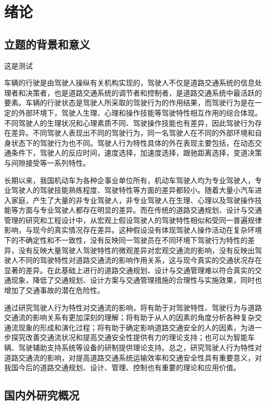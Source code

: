 \chapter{绪论}
\section{立题的背景和意义}
这是测试\cite{seugs:standard}

车辆的行驶是由驾驶人操纵有关机构实现的，驾驶人不仅是道路交通系统的信息处理者和决策者，也是道路交通系统的调节者和控制者，是道路交通系统中最活跃的要素。车辆的行驶状态是驾驶人所采取的驾驶行为的作用结果，而驾驶行为是在一定的外部环境下，驾驶人生理、心理和操作技能等驾驶特性相互作用的综合体现。不同驾驶人的生理状况和心理素质不同、驾驶操作技能也有差异，因此驾驶行为存在差异。不同驾驶人表现出不同的驾驶行为，同一名驾驶人在不同的外部环境和自身状态下的驾驶行为也不同。驾驶人行为特性具体的外在表现主要包括，在动态交通条件下，驾驶人的反应时间，速度选择，加速度选择，跟驰距离选择，变道决策与间隙接受等一系列特性。

长期以来，我国机动车为各种企事业单位所有，机动车驾驶人均为专业驾驶人，专业驾驶人的驾驶技能熟练程度、驾驶特性等方面的差异都较小。随着大量小汽车进入家庭，产生了大量的非专业驾驶人，非专业驾驶人在生理、心理以及驾驶操作技能等方面与专业驾驶人都存在明显的差异。而在传统的道路交通规划、设计与交通管理的研究和工程设计中，从宏观上假设驾驶人的驾驶特性相似和受同一普遍规律影响，与现今的真实情况存在差异。这种假设没有体现驾驶人操作活动在复杂环境下的不确定性和不一致性，没有反映同一驾驶员在不同环境下驾驶行为特性的差异，没有反映大量驾驶人驾驶特性的微观差异对宏观交通流的影响，没有反映出驾驶人不同的驾驶特性对道路交通流的影响作用关系，这与现今真实的交通状况存在显著的差异。在此基础上进行的道路交通规划、设计与交通管理难以符合真实的交通现象，降低了交通规划、设计方案与交通管理措施的合理性与实施效果，同时也增加了交通事故的潜在危险性。

通过研究驾驶人行为特性对交通流的影响，将有助于对驾驶特性、驾驶行为与道路交通流的影响关系有更加深刻的理解；将有助于从人的因素的角度分析各种复杂交通流现象的形成和演化过程；将有助于确定影响道路交通安全的人的因素，为进一步探究改善交通流状况和提高交通安全性提供有力的理论支持；也可以为智能车辆、驾驶辅助支持系统等设备的研制提供理论支持。总之，研究驾驶人行为特性对道路交通流的影响，对提高道路交通系统运输效率和交通安全性具有重要意义，对我国今后的道路交通规划、设计、管理、控制也有重要的理论和应用价值。



\section{国内外研究概况}

